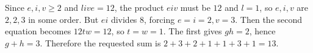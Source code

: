 Since $e,i,v\ge2$ and $live=12$, the product $eiv$ must be $12$ and $l=1$, so $e,i,v$ are $2,2,3$ in some order. But $ei$ divides $8$, forcing $e=i=2,v=3$. Then the second equation becomes $12tw=12$, so $t=w=1$. The first gives $gh=2$, hence $g+h=3$. Therefore the requested sum is $\boxed{2+3+2+1+1+3+1=13}$.
